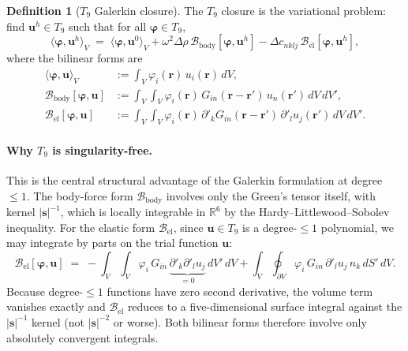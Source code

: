 \documentclass[11pt,a4paper]{article}
\newcommand{\D}{\Delta}
\newcommand{\bs}{\bm{s}}
\newcommand{\br}{\bm{r}}
\newcommand{\bu}{\bm{u}}
\newcommand{\bphi}{\bm{\varphi}}
\newcommand{\R}{\mathbb{R}}
\theoremstyle{plain}
\theoremstyle{definition}
\newtheorem{definition}[theorem]{Definition}
\theoremstyle{remark}
\begin{document}
\begin{definition}[$T_9$ Galerkin closure]
The $T_9$ closure is the variational problem: find $\bu^h \in T_9$ such
that for all $\bphi \in T_9$,
\begin{equation}
  \langle\bphi,\bu^h\rangle_V
  \;=\;
  \langle\bphi,\bu^{0}\rangle_V
  + \omega^{2}\D\rho\,\mathcal{B}_{\mathrm{body}}[\bphi,\bu^{h}]
  - \D c_{nklj}\,\mathcal{B}_{\mathrm{el}}[\bphi,\bu^{h}],
  \label{eq:galerkin-LS-T9}
\end{equation}
where the bilinear forms are
\begin{align}
\langle\bphi,\bu\rangle_V &:= \int_{V} \varphi_i(\br)\, u_i(\br)\,dV,
  \label{eq:mass-form} \\[3pt]
\mathcal{B}_{\mathrm{body}}[\bphi,\bu] &:= \int_{V}\!\!\int_{V}
  \varphi_i(\br)\,G_{in}(\br-\br')\,u_n(\br')\,dV\,dV',
  \label{eq:body-form} \\[3pt]
\mathcal{B}_{\mathrm{el}}[\bphi,\bu] &:= \int_{V}\!\!\int_{V}
  \varphi_i(\br)\,\partial'_k G_{in}(\br-\br')\,
  \partial'_l u_j(\br')\,dV\,dV'.
  \label{eq:elastic-form}
\end{align}
\end{definition}

\paragraph{Why $T_9$ is singularity-free.}
This is the central structural advantage of the Galerkin formulation at
degree~$\le 1$.  The body-force form $\mathcal{B}_{\mathrm{body}}$
involves only the Green's tensor itself, with kernel $|\bs|^{-1}$, which
is locally integrable in $\R^{6}$ by the Hardy--Littlewood--Sobolev
inequality.  For the elastic form $\mathcal{B}_{\mathrm{el}}$, since
$\bu \in T_9$ is a degree-$\le 1$ polynomial, we may integrate by parts
on the trial function $\bu$:
\begin{equation}
  \mathcal{B}_{\mathrm{el}}[\bphi,\bu]
  \;=\;
  -\int_{V}\!\!\int_V\!\varphi_i\,G_{in}\,
    \underbrace{\partial'_k\partial'_l u_j}_{=0}\,dV'\,dV
  + \int_{V}\!\!\oint_{\partial V}\!\varphi_i\,G_{in}\,
    \partial'_l u_j\,n_k\,dS'\,dV.
  \label{eq:ibp-elastic}
\end{equation}
Because degree-$\le 1$ functions have zero second derivative, the volume
term vanishes exactly and $\mathcal{B}_{\mathrm{el}}$ reduces to a
five-dimensional surface integral against the $|\bs|^{-1}$ kernel (not
$|\bs|^{-2}$ or worse).  Both bilinear forms therefore involve only
absolutely convergent integrals.
\end{document}
